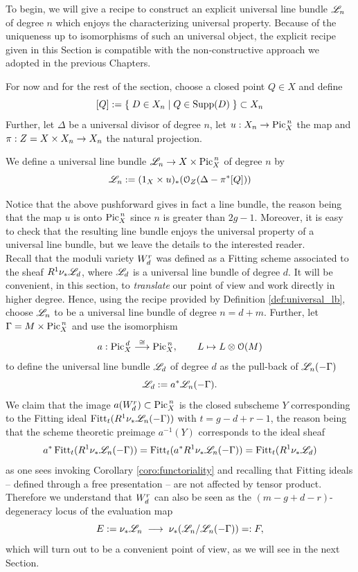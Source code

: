 	To begin, we will give a recipe to construct an explicit universal line bundle $\mathscr{L}_n$ of degree $n$ which enjoys the characterizing universal property. Because of the uniqueness up to isomorphisms of such an universal object, the explicit recipe given in  this Section is compatible with the non-constructive approach we adopted in the previous Chapters.

	For now and for the rest of the section, choose a closed point $Q\in X$ and define 
	$$ [Q] := \left\{\;  D\in X_n \mid Q \in \operatorname{Supp}(D)  \; \right\} \subset X_n $$
	Further, let $\Delta$ be a universal divisor of degree $n$, let $u:X_n\to\operatorname{Pic}^{\,n}_X$ the \AJJ map and $\pi:Z=X\times X_n\to X_n$ the natural projection. 
	\begin{defi}\label{def:universal_lb}
		We define a universal line bundle $\mathscr{L}_n \to X\times\operatorname{Pic}^{\,n}_X$ of degree $n$ by
		$$ \mathscr{L}_n := (1_X\times u)_*(\mathcal{O}_Z(\Delta - \pi^* [Q])) $$
	\end{defi}
	Notice that the above pushforward gives in fact a line bundle, the reason being that the \AJJ map $u$ is onto $\operatorname{Pic}^{\,n}_X$ since $n$ is greater than $2g-1$.
	Moreover, it is easy to check that the resulting line bundle enjoys the universal property of a universal line bundle, but we leave the details to the interested reader. \\

	Recall that the moduli variety $W_d^r$ was defined as a Fitting scheme associated to the sheaf $R^1\nu_{*}\mathscr{L}_d$, where $\mathscr{L}_d$ is a universal line bundle of degree $d$. 
	It will be convenient, in this section, to \emph{translate} our point of view and work directly in higher degree. 
	Hence, using the recipe provided by Definition \ref{def:universal_lb}, choose $\mathscr{L}_n$ to be a universal line bundle of degree $n=d+m$. 
	Further, let $\Gamma = M\times \operatorname{Pic}^{\,n}_X$ and use the isomorphism
	$$ a:\operatorname{Pic}^{\,d}_X\overset{\cong}\longrightarrow\operatorname{Pic}^{\,n}_X, \qquad L\mapsto L\otimes \mathcal{O}(M) $$
	to define the universal line bundle $\mathscr{L}_d$ of degree $d$ as the pull-back of $\mathscr{L}_n(-\Gamma)$ 
	$$ \mathscr{L}_d := a^*\mathscr{L}_n(-\Gamma). $$
	We claim that the image $a(W_d^r)\subset \operatorname{Pic}^{\,n}_X$ is the closed subscheme $Y$ corresponding to the Fitting ideal $\operatorname{Fitt}_{t}(R^1\nu_{*}\mathscr{L}_n(-\Gamma)) $ with $t=g-d+r-1$, the reason being that the scheme theoretic preimage $a^{-1}(Y)$ corresponds to the ideal sheaf
	$$ 	a^*\operatorname{Fitt}_{t}(R^1\nu_{*}\mathscr{L}_n(-\Gamma)) 
	= 	\operatorname{Fitt}_{t}(a^*R^1\nu_{*}\mathscr{L}_n(-\Gamma)) 
	= 	\operatorname{Fitt}_{t}(R^1\nu_{*} \mathscr{L}_d)
	$$
	as one sees invoking Corollary \ref{coro:functoriality} and recalling that Fitting ideals -- defined through a free presentation -- are not affected by tensor product.
	Therefore we understand that $W_d^r$ can also be seen as the $(m-g+d-r)$-degeneracy locus of the evaluation map
	$$ E:=\nu_{*} \mathscr{L}_n \;\longrightarrow\; \nu_{*} (\mathscr{L}_n / \mathscr{L}_n(-\Gamma))=:F, $$
	which will turn out to be a convenient point of view, as we will see in the next Section.


